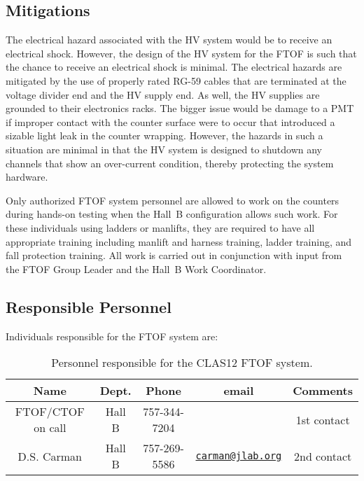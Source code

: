 \subsection{Mitigations}

The electrical hazard associated with the HV system would be to receive an electrical 
shock. However, the design of the HV system for the FTOF is such that the chance to 
receive an electrical shock is minimal. The electrical hazards are mitigated by the use 
of properly rated RG-59 cables that are terminated at the voltage divider end and the HV 
supply end. As well, the HV supplies are grounded to their electronics racks. The bigger 
issue would be damage to a PMT if improper contact with the counter surface were to occur 
that introduced a sizable light leak in the counter wrapping. However, the hazards in such 
a situation are minimal in that the HV system is designed to shutdown any channels that 
show an over-current condition, thereby protecting the system hardware. 

Only authorized FTOF system personnel are allowed to work on the counters during hands-on
testing when the Hall~B configuration allows such work. For these individuals using ladders 
or manlifts, they are required to have all appropriate training including manlift and
harness training, ladder training, and fall protection training. All work is carried out 
in conjunction with input from the FTOF Group Leader and the Hall~B Work Coordinator.

\subsection{Responsible Personnel}

Individuals responsible for the FTOF system are:

\begin{table}[!htb]
\centering
\begin{tabular}{|c|c|c|c|c|} \hline
Name              & Dept.  & Phone        & email & Comments \\ \hline
FTOF/CTOF on call & Hall B & 757-344-7204 &       & 1st contact \\ \hline
D.S. Carman       & Hall B & 757-269-5586 & \href{mailto:carman@jlab.org}{\nolinkurl{carman@jlab.org}} & 2nd contact \\ \hline
\end{tabular}
\caption{Personnel responsible for the CLAS12 FTOF system.} 
\label{tb:ftof}
\end{table}

